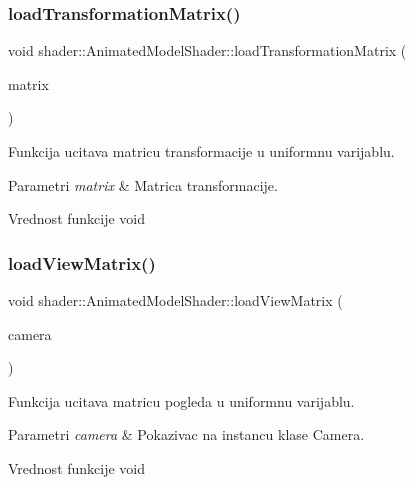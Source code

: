 \subsubsection{\texorpdfstring{load\+Transformation\+Matrix()}{loadTransformationMatrix()}}
{\footnotesize\ttfamily void shader\+::\+Animated\+Model\+Shader\+::load\+Transformation\+Matrix (\begin{DoxyParamCaption}\item[{mat4}]{matrix }\end{DoxyParamCaption})}



Funkcija ucitava matricu transformacije u uniformnu varijablu. 


\begin{DoxyParams}{Parametri}
{\em matrix} & Matrica transformacije. \\
\hline
\end{DoxyParams}
\begin{DoxyReturn}{Vrednost funkcije}
void 
\end{DoxyReturn}
\mbox{\label{classshader_1_1AnimatedModelShader_a9a91e6dbe9edd8a25492b8b0974d5c92}} 
\subsubsection{\texorpdfstring{load\+View\+Matrix()}{loadViewMatrix()}}
{\footnotesize\ttfamily void shader\+::\+Animated\+Model\+Shader\+::load\+View\+Matrix (\begin{DoxyParamCaption}\item[{\hyperlink{classentity_1_1Camera}{Camera} $\ast$}]{camera }\end{DoxyParamCaption})}



Funkcija ucitava matricu pogleda u uniformnu varijablu. 


\begin{DoxyParams}{Parametri}
{\em camera} & Pokazivac na instancu klase Camera. \\
\hline
\end{DoxyParams}
\begin{DoxyReturn}{Vrednost funkcije}
void 
\end{DoxyReturn}
\mbox{\label{classshader_1_1AnimatedModelShader_adae3f58a0687245d7be0be21c99a1360}} 
